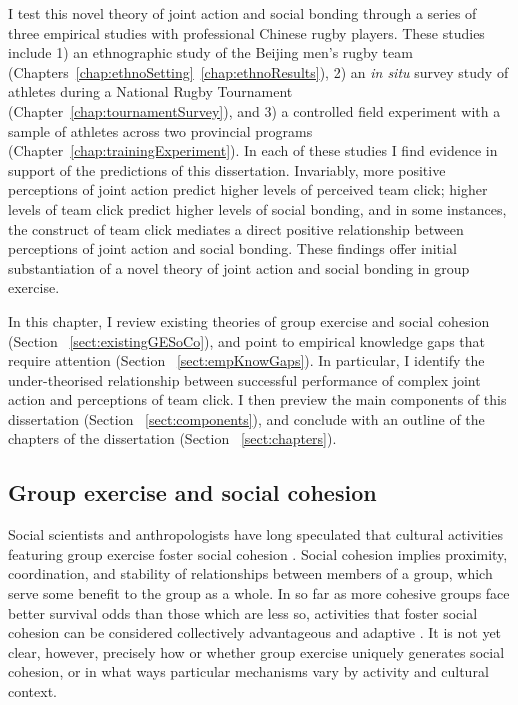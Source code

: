 \begin{CJK}{UTF8}{gbsn}
I test this novel theory of joint action and social bonding through a series of three empirical studies with professional Chinese rugby players. These studies include 1) an ethnographic study of the Beijing men's rugby team (Chapters~\ref{chap:ethnoSetting}\nobreakdash~\ref{chap:ethnoResults}), 2) an \textit{in situ} survey study of athletes during a National Rugby Tournament (Chapter~\ref{chap:tournamentSurvey}), and 3) a controlled field experiment with a sample of athletes across two provincial programs (Chapter~\ref{chap:trainingExperiment}).  In each of these studies I find evidence in support of the predictions of this dissertation.  Invariably, more positive perceptions of joint action predict higher levels of perceived team click; higher levels of team click predict higher levels of social bonding, and in some instances, the construct of team click mediates a direct positive relationship between perceptions of joint action and social bonding.  These findings offer initial substantiation of a novel theory of joint action and social bonding in group exercise.

In this chapter, I review existing theories of group exercise and social cohesion (Section ~\ref{sect:existingGESoCo}), and point to empirical knowledge gaps that require attention (Section ~\ref{sect:empKnowGaps}). In particular, I identify the under-theorised relationship between successful performance of complex joint action and perceptions of team click.  I then preview the main components of this dissertation (Section ~\ref{sect:components}), and conclude with an outline of the chapters of the dissertation (Section ~\ref{sect:chapters}).



\subsection{Group exercise and social cohesion\label{sect:GESoCo}}
Social scientists and anthropologists \citep[see, for example][]{Durkheim1965} have long speculated that cultural activities featuring group exercise foster social cohesion \citep{Whitehouse2004}.  Social cohesion implies proximity, coordination, and stability of relationships between members of a group, which serve some benefit to the group as a whole.  In so far as more cohesive groups face better survival odds than those which are less so, activities that foster social cohesion can be considered collectively advantageous and adaptive \citep{Dunbar2010}.  It is not yet clear, however, precisely how or whether group exercise uniquely generates social cohesion, or in what ways particular mechanisms vary by activity and cultural context.


\end{CJK}
